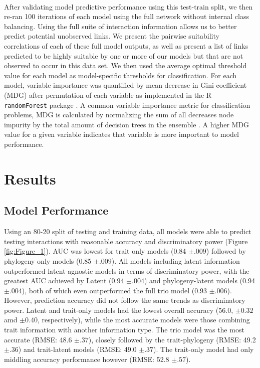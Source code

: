 \documentclass[num-refs]{wiley-article}%
\begin{document}
\paragraph{}
After validating model predictive performance using this test-train split, we then re-ran 100 iterations of each model using the full network without internal class balancing. Using the full suite of interaction information allows us to better predict potential unobserved links. We present the pairwise suitability correlations of each of these full model outputs, as well as present a list of links predicted to be highly suitable by one or more of our models but that are not observed to occur in this data set. We then used the average optimal threshold value for each model as model-specific thresholds for classification. For each model, variable importance was quantified by mean decrease in Gini coefficient  (MDG) after permutation of each variable as implemented in the R \texttt{randomForest} package \cite{randomForest}. A common variable importance metric for classification problems, MDG is calculated by normalizing the sum of all decreases node impurity by the total amount of decision trees in the ensemble \cite{khalilia2011predicting, calle2011stability}. A higher MDG value for a given variable indicates that variable is more important to model performance. 






\section*{Results}

\subsection*{Model Performance}
Using an 80-20 split of testing and training data, all models were able to predict testing interactions with reasonable accuracy and discriminatory power (Figure \ref{fig:Figure_1}). AUC was lowest for trait only models (0.84 $\pm.009$) followed by phylogeny only models (0.85 $\pm .009$). All models including latent information outperformed latent-agnostic models in terms of discriminatory power, with the greatest AUC achieved by Latent (0.94 $\pm .004$) and phylogeny-latent models (0.94 $\pm .004$), both of which even outperformed the full trio model (0.93 $\pm .006$). However, prediction accuracy did not follow the same trends as discriminatory power. Latent and trait-only models had the lowest overall accuracy (56.0, $\pm 0.32$ amd $\pm 0.40$, respectively), while the most accurate models were those combining trait information with another information type. The trio model was the most accurate (RMSE: 48.6 $\pm .37$), closely followed by the trait-phylogeny (RMSE: 49.2 $\pm .36$) and trait-latent models (RMSE: 49.0 $\pm .37$). The trait-only model had only middling accuracy performance however (RMSE: 52.8 $\pm .57$).
\end{document}
